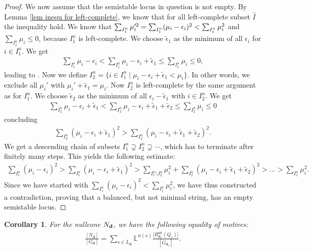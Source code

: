 \documentclass[10pt,a4paper]{amsart}
\numberwithin{equation}{section}
\newtheorem{Corollary}[Theorem]{Corollary}
\theoremstyle{definition}
\begin{document}
\begin{proof}
We now assume that the semistable locus in question is not empty.
By Lemma \ref{lem inequ for left-complete}, we know that for all left-complete subset $\hat{I}$ the inequality  hold.
We know that $\smash{\sum_{I^n_1} \mu_i'^2} = \sum_{I^n_1} (\mu_i - \epsilon_i)^2 < \sum_{I^n_1} \mu_i^2$ and $\sum_{I^n_1} \mu_i \leq 0$, because $I^n_1$ is left-complete. We choose $\tilde{\epsilon}_1$ as the minimum of all $\epsilon_i$ for $i \in I^n_1$. We get
\begin{align*}
\sum_{I^n_1} \mu_i -\epsilon_i < \sum_{I^n_1} \mu_i - \epsilon_i + \tilde{\epsilon}_1 \leq \sum_{I^n_1} \mu_i \leq 0 ,
\end{align*}
leading to .
Now we define
$
I^n_2 = \{i \in I^n_1 \mid \mu_i -\epsilon_i + \tilde{\epsilon}_1 < \mu_i\} $.
In other words, we exclude all $\mu_i'$ with $\mu_i' + \tilde{\epsilon}_1 = \mu_i$.
Now $I^n_2$ is left-complete by the same argument as for $I^n_1$. We choose $\tilde{\epsilon}_2$ as the minimum of all $\epsilon_i - \tilde{\epsilon}_1$ with $i \in I^n_2$. We get
\begin{align*}
\sum_{I^n_2} \mu_i - \epsilon_i +\tilde{\epsilon}_1 < \sum_{I^n_2} \mu_i - \epsilon_i+ \tilde{\epsilon}_1 + \tilde{\epsilon}_2 \leq \sum_{I^n_2} \mu_i \leq 0
\end{align*}
concluding
\begin{align*}
\sum_{I^n_2} (\mu_i - \epsilon_i + \tilde{\epsilon}_1)^2 > \sum_{I^n_2} (\mu_i - \epsilon_i + \tilde{\epsilon}_1 + \tilde{\epsilon}_2)^2.
\end{align*}
We get a descending chain of subsets
$
I_1^n \supsetneq I_2^n \supsetneq \cdots$,
which has to terminate after finitely many steps. This yields the following estimate:
\begin{align*}
\sum_{I^n_1} (\mu_i -\epsilon_i)^2 > \sum_{I^n_1} (\mu_i - \epsilon_i + \tilde{\epsilon}_1)^2 > \sum_{I^n_1 \setminus I^n_2} \mu_i^2 + \sum_{I^n_2} (\mu_i - \epsilon_i + \tilde{\epsilon}_1 + \tilde{\epsilon}_2)^2 > \dots > \sum_{I^n_1} \mu_i^2 .
\end{align*}
Since we have started with $\sum_{I^n_1} (\mu_i -\epsilon_i)^2 < \sum_{I^n_1} \mu_i^2$, we have thus constructed a contradiction, proving that a balanced, but not minimal string, has an empty semistable locus.
\end{proof}

\begin{Corollary}
 For the nullcone $N_{\bf d}$, we have the following equality of motives:
 \begin{align*}
 \frac{[ N_{\mathbf{d}}]}{[ G_{\mathbf{d}}]} = \sum_{s \in {\overline{L}_{\mathbf{d}}}} \mathbb{L}^{\phi(s)} \frac{\big[R^{\mathrm{sst}}_{\mathbf{d}_s}(Q_s)\big]}{[G_{\mathbf{d}_s}]} .
 \end{align*}
\end{Corollary}
\end{document}
